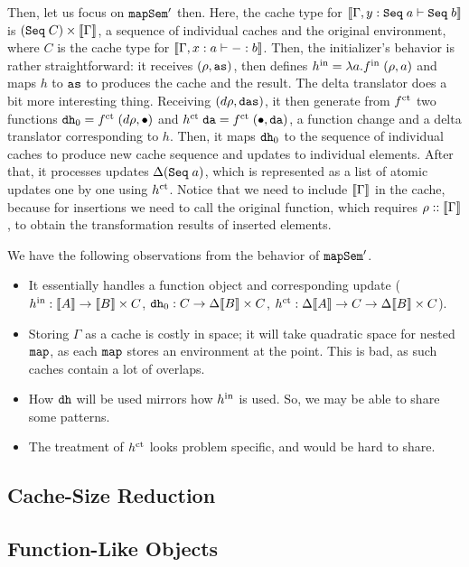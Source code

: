 \documentclass{article}
\theoremstyle{definition}
\begin{document}
Then, let us focus on $\texttt{mapSem}'$ then. Here, the cache type for $\sem{ \Gamma, y : \con{Seq} \A a \vdash \con{Seq} \A b }$ 
is $(\con{Seq} \A C) \x \sem{\Gamma}$, a sequence of individual caches and the original environment, where $C$ is the cache type for 
$\sem{ \Gamma, x : a \vdash - : b }$. Then, the initializer's behavior is rather straightforward: it receives $(\rho, \texttt{as})$,
then defines $h^{\text{in}} = \lambda a.f^{\text{in}} \; (\rho,a)$ and maps $h$ to $\texttt{as}$ to produces the cache and the result. 
The delta translator does a bit more interesting thing. Receiving $(d\rho, \texttt{das})$, 
it then generate from $f^{\text{ct}}$ two functions $\texttt{dh}_0 = f^{\text{ct}} \; (d\rho, {\bullet})$ and 
$h^{\text{ct}} \; \texttt{da} = f^{\text{ct}} \; ({\bullet}, \texttt{da})$, a function change and a delta translator corresponding to $h$. 
Then, it maps $\texttt{dh}_0$ to the sequence of individual caches to produce new cache sequence and updates to individual elements.
After that, it processes updates $\Delta (\texttt{Seq} \; a)$, which is represented as a list of atomic updates one by one using $h^{\text{ct}}$. 
Notice that we need to include $\sem{\Gamma}$ in the cache, because for insertions we need to call the original function, which requires $\rho :: \sem{\Gamma}$, to obtain the transformation results of inserted elements. 

We have the following observations from the behavior of $\texttt{mapSem}'$. 
\begin{itemize}
 \item It essentially handles a function object and corresponding update ($\init{h} : \sem{A} \to \sem{B} \x C$, $\var{dh}_0 : C \to \Delta \sem{B} \x C$, $\cts{h} : \Delta \sem{A} \to C \to \Delta \sem{B} \x C$).
 \item Storing $\Gamma$ as a cache is costly in space; it will take quadratic space for nested $\texttt{map}$, as each $\texttt{map}$ stores 
   an environment at the point. This is bad, as such caches contain a lot of overlaps. 
 \item How $\texttt{dh}$ will be used mirrors how $h^{\text{in}}$ is used. So, we may be able to share some patterns. 
 \item The treatment of $h^{\text{ct}}$ looks problem specific, and would be hard to share. 
\end{itemize}


\subsection{Cache-Size Reduction}



\subsection{Function-Like Objects}





\end{document}
